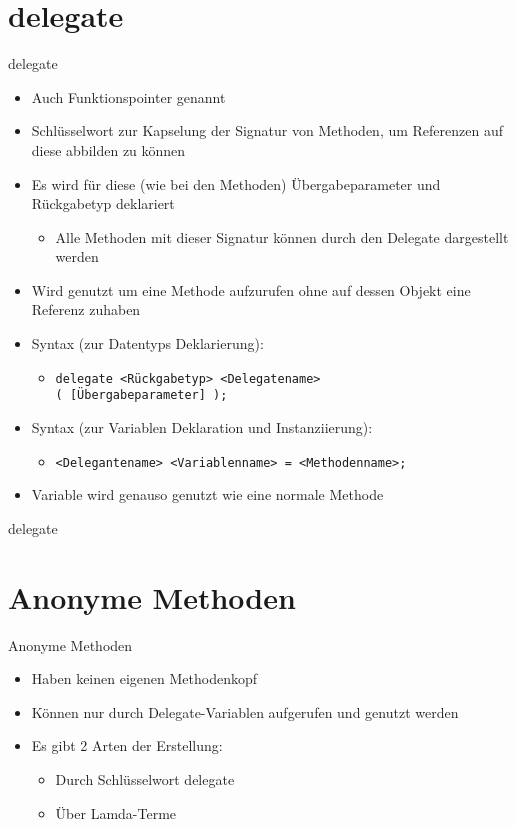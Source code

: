 \section{delegate}
\begin{frame}{delegate}
	\begin{itemize}
		\item Auch Funktionspointer genannt
		\item Schlüsselwort zur Kapselung der Signatur von Methoden, um Referenzen auf diese abbilden zu können
		\item Es wird für diese (wie bei den Methoden) Übergabeparameter und Rückgabetyp deklariert
			\begin{itemize}
				\item Alle Methoden mit dieser Signatur können durch den Delegate dargestellt werden
			\end{itemize}
		\item Wird genutzt um eine Methode aufzurufen ohne auf dessen Objekt eine Referenz zuhaben
		\item Syntax (zur Datentyps Deklarierung):
		\begin{itemize}
			\item \texttt{delegate \alert{<Rückgabetyp> <Delegatename>}\\( \alert{[Übergabeparameter]} );}
		\end{itemize}
		\item Syntax (zur Variablen Deklaration und Instanziierung):
		\begin{itemize}
			\item \texttt{\alert{<Delegantename> <Variablenname>} = \alert{<Methodenname>};}
		\end{itemize}
		\item Variable wird genauso genutzt wie eine normale Methode
	\end{itemize}
\end{frame}

\begin{frame}{delegate}
	
	
\end{frame}

\section{Anonyme Methoden}
\begin{frame}{Anonyme Methoden}
	\begin{itemize}
		\item Haben keinen eigenen Methodenkopf
		\item Können nur durch Delegate-Variablen aufgerufen und genutzt werden
		\item Es gibt 2 Arten der Erstellung:
		\begin{itemize}
			\item Durch Schlüsselwort \alert{delegate}
			\item Über Lamda-Terme
		\end{itemize}	
	\end{itemize}
\end{frame}

